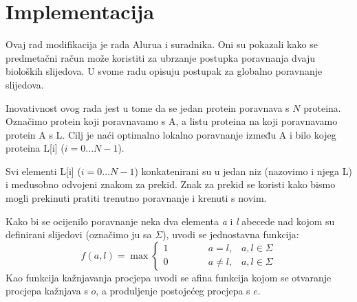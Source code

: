 \documentclass[times, utf8, zavrsni, numeric]{fer}
\begin{document}
\chapter{Implementacija}
\indent

Ovaj rad modifikacija je rada Alurua i suradnika\cite{aluru}. Oni su pokazali kako se predmetačni račun može koristiti za ubrzanje postupka poravnanja dvaju bioloških slijedova. U svome radu opisuju postupak za globalno poravnanje slijedova.

Inovativnost ovog rada jest u tome da se jedan protein poravnava s $N$ proteina. Označimo protein koji poravnavamo s A, a listu proteina na koji poravnavamo protein A s L. Cilj je naći optimalno lokalno poravnanje između A i bilo kojeg proteina L[i] ($i = 0...N-1$).

Svi elementi L[i] ($i = 0...N-1$) konkatenirani su u jedan niz (nazovimo i njega L) i međusobno odvojeni znakom za prekid. Znak za prekid se koristi kako bismo mogli prekinuti pratiti trenutno poravnanje i krenuti s novim.

Kako bi se ocijenilo poravnanje neka dva elementa \emph{a} i \emph{l} abecede nad kojom su definirani slijedovi (označimo ju sa $\Sigma$), uvodi se jednostavna funkcija:
\begin{equation}
f(a, l) = \max \left\{
	\begin{array}{lr}
		1\hspace{50pt}a = l,\hspace{10pt}a,l \in \Sigma \\
		0\hspace{50pt}a \ne l,\hspace{10pt}a, l \in \Sigma
	\end{array}
\right.
\end{equation}
Kao funkcija kažnjavanja procjepa uvodi se afina funkcija kojom se otvaranje procjepa kažnjava s $o$, a produljenje postojećeg procjepa s $e$.
\end{document}
